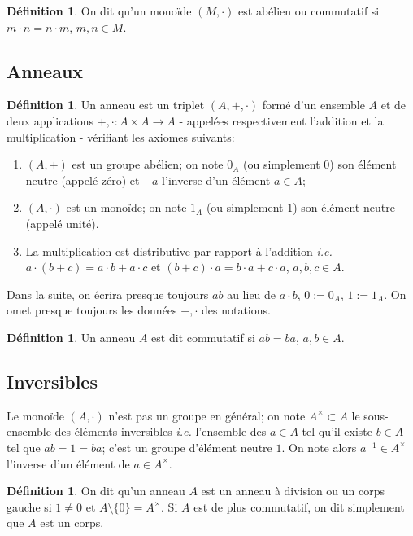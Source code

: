 \documentclass[a4paper, oneside, 12pt]{book}
\theoremstyle{theoremeStyle} %
\theoremstyle{definition} %
\newtheorem{definition}[theoreme]{Définition}
\newcommand{\ie}{\textit{i.e.}} %
\begin{document}
\begin{definition}On dit qu'un monoïde $(M,\cdot)$ est abélien ou commutatif si $m\cdot n=n\cdot m$, $m,n\in M$.
\end{definition}

\subsection{Anneaux}
\begin{definition}Un anneau est  un triplet $(A,+,\cdot)$ formé d'un ensemble $A$ et de deux applications $+,\cdot :A\times A\rightarrow A$ - appelées respectivement l'addition et la multiplication -  vérifiant les axiomes suivants:
\begin{enumerate}
\item $(A,+)$ est un groupe abélien; on note $0_A$ (ou simplement $0$) son élément neutre (appelé zéro) et $-a$ l'inverse d'un élément $a\in A$;
\item $(A ,\cdot)$ est un monoïde; on note $1_A$ (ou simplement $1$) son élément neutre (appelé unité).
\item La multiplication est distributive par rapport à l'addition \ie{} $a\cdot (b+c)=a\cdot b+a\cdot c$ et $(b+c)\cdot a=b\cdot a+c\cdot a$, $a,b,c\in A$.\\
\end{enumerate}
\end{definition}
 Dans la suite, on écrira presque toujours $ab$ au lieu de $a\cdot b$, $0:=0_A$, $1:=1_A$. On omet presque toujours les données $+,\cdot$ des notations.\\


 \begin{definition}Un anneau $A$ est dit commutatif si    $a b=ba$, $a,b\in A$. \end{definition}


\subsection{Inversibles}

Le monoïde $(A ,\cdot)$ n'est pas un groupe en général; on note $A^\times\subset A $ le sous-ensemble des éléments inversibles \ie{} l'ensemble des $ a\in A$ tel qu'il existe $b\in A$ tel que $ab=1=ba$; c'est un groupe d'élément neutre $1$. On note alors $a^{-1}\in A^\times$ l'inverse d'un élément de $a\in A^\times$.\\


\begin{definition}On dit qu'un anneau $A$ est un anneau à division ou un corps gauche si $1\not=0$ et $A\setminus \lbrace 0\rbrace=A^\times$. Si $A$ est de plus commutatif, on dit simplement que $A$ est un corps.\end{definition}
\end{document}
